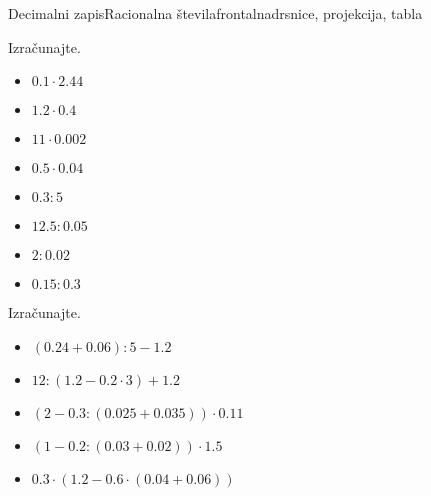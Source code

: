 \begin{priprava}{11}{}{Decimalni zapis}{Racionalna števila}{frontalna}{drsnice, projekcija, tabla}
\begin{multicols}{2}
\begin{naloga}
    Izračunajte.
    \begin{itemize}
                \item $0.1\cdot 2.44$ 
                \item $1.2\cdot 0.4$ 
                \item $11\cdot 0.002$ 
                \item $0.5\cdot 0.04$ 
                \item $0.3: 5$ 
                \item $12.5: 0.05$ 
                \item $2: 0.02$ 
                \item $0.15: 0.3$ 
    \end{itemize}
\end{naloga}




\begin{naloga}
    Izračunajte.
    \begin{itemize}
                \item $\left(0.24 + 0.06\right):5 - 1.2$ 
                \item $12:\left(1.2- 0.2\cdot 3\right)+1.2$ 
                \item $\left(2-0.3:\left(0.025 + 0.035\right)\right)\cdot 0.11$ 
                \item $\left(1-0.2:\left(0.03+0.02\right)\right)\cdot 1.5$ 
                \item $0.3\cdot\left(1.2-0.6\cdot\left(0.04+0.06\right)\right)$ 
    \end{itemize}
\end{naloga}

\end{multicols}

\end{priprava}